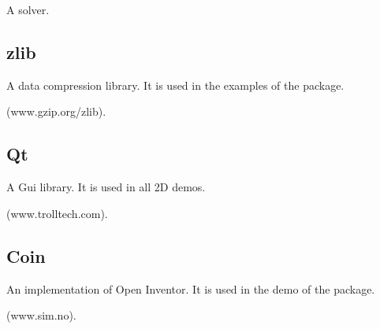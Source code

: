 A solver.

\subsection{zlib \label{thirdparty:zlib}}

A data compression library.
It is used in the examples of the  package.

 (www.gzip.org/zlib).

\subsection{Qt \label{thirdparty:Qt}}

A {\sc Gui} library.   It is used in all 2D demos.

 (www.trolltech.com).


\subsection{Coin \label{thirdparty:Coin}}

An implementation of Open Inventor.  It is used in the demo
of the  package.

(www.sim.no).

